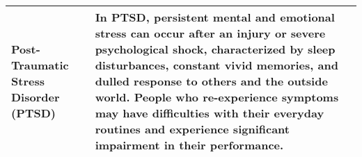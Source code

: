 \begin{center}
\begin{tabular}{|p{4cm}|p{10cm}|}
  \hline
  Post-Traumatic Stress Disorder (PTSD) & In PTSD, persistent mental and emotional stress can occur after an injury or severe psychological shock, characterized by sleep disturbances, constant vivid memories, and dulled response to others and the outside world. People who re-experience symptoms may have difficulties with their everyday routines and experience significant impairment in their performance. \\
  \hline 
\end{tabular}

  
\end{center}


